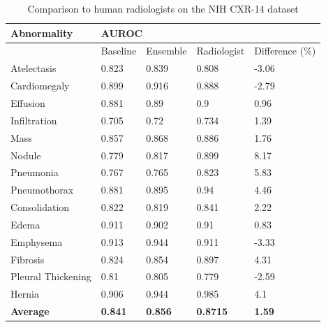 \documentclass[12pt,oneside,a4paper]{report}
\begin{document}
\begin{table}[]
  \centering
  \begin{tabular}{lllll}
    \hline
    \textbf{Abnormality} & \multicolumn{4}{l}{\textbf{AUROC}}             \\ \hline
                         & Baseline & Ensemble & Radiologist & Difference (\%) \\ \hline
    Atelectasis          & 0.823    & 0.839    & 0.808       & -3.06      \\ \hline
    Cardiomegaly         & 0.899    & 0.916    & 0.888       & -2.79      \\ \hline
    Effusion             & 0.881    & 0.89     & 0.9         & 0.96       \\ \hline
    Infiltration         & 0.705    & 0.72     & 0.734       & 1.39       \\ \hline
    Mass                 & 0.857    & 0.868    & 0.886       & 1.76       \\ \hline
    Nodule               & 0.779    & 0.817    & 0.899       & 8.17       \\ \hline
    Pneumonia            & 0.767    & 0.765    & 0.823       & 5.83       \\ \hline
    Pneumothorax         & 0.881    & 0.895    & 0.94        & 4.46       \\ \hline
    Consolidation        & 0.822    & 0.819    & 0.841       & 2.22       \\ \hline
    Edema                & 0.911    & 0.902    & 0.91        & 0.83       \\ \hline
    Emphysema            & 0.913    & 0.944    & 0.911       & -3.33      \\ \hline
    Fibrosis             & 0.824    & 0.854    & 0.897       & 4.31       \\ \hline
    Pleural Thickening  & 0.81     & 0.805    & 0.779       & -2.59      \\ \hline
    Hernia               & 0.906    & 0.944    & 0.985       & 4.1        \\ \hline
    \textbf{Average}              & \textbf{0.841}    & \textbf{0.856}    & \textbf{0.8715}      & \textbf{1.59}       \\ \hline
  \end{tabular}
  \caption{Comparison to human radiologists on the NIH CXR-14 dataset}
  \label{tab:nih_comparision}
\end{table}
\end{document}
